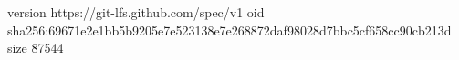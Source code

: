 version https://git-lfs.github.com/spec/v1
oid sha256:69671e2e1bb5b9205e7e523138e7e268872daf98028d7bbc5cf658cc90cb213d
size 87544
